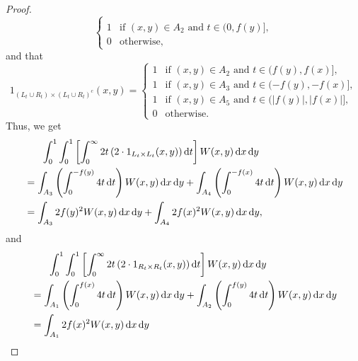 \documentclass[12pt,a4paper,bold]{thesis}
\theoremstyle{definition}
\newcommand*{\abs}[1]{\left\vert #1 \right\vert}
\begin{document}
\begin{proof}
\begin{equation*}
\begin{cases}
            \\
            1 & \text{if } (x,y) \in A_2 \text{ and } t \in (0, f(y)],
            \\
            0 & \text{otherwise,}
        \end{cases} 
    \end{equation*}
    and that
    \begin{equation*}
        1_{(L_t \cup R_t) \times (L_t \cup R_t)^c}(x,y) =
        \begin{cases}
            1 & \text{if } (x,y) \in A_2 \text{ and } t \in (f(y), f(x)],
            \\
            1 & \text{if } (x,y) \in A_3 \text{ and } t \in (-f(y), -f(x)],
            \\
            1 & \text{if } (x,y) \in A_5 \text{ and } t \in (\abs{f(y)}, \abs{f(x)}],
            \\
            0 & \text{otherwise.}
        \end{cases} 
    \end{equation*}
    Thus, we get
    \begin{align*}
        & \hspace{0.6cm} \int_0^1 \int_{0}^{1} 
        \left[\int_{0}^{\infty} 2t \left(2 \cdot 1_{L_t \times L_t}(x,y)
        \right) \mathrm{d}t\right] W(x,y)\, \mathrm{d}x\, \mathrm{d}y
        \\
        & = 
        \int_{A_3} \left(\int_{0}^{-f(y)} 4t\, \mathrm{d}t\right) W(x,y)\, 
        \mathrm{d}x\, \mathrm{d}y + \int_{A_4} \left(\int_{0}^{-f(x)} 4t\, 
        \mathrm{d}t\right) W(x,y)\, \mathrm{d}x\, \mathrm{d}y
        \\
        & =
        \int_{A_3} 2f(y)^2 W(x,y)\, \mathrm{d}x\, \mathrm{d}y 
        + \int_{A_4} 2f(x)^2 W(x,y)\, \mathrm{d}x\, \mathrm{d}y,
    \end{align*}
    and
    \begin{align*}
        & \hspace{0.6cm} \int_0^1 \int_{0}^{1} 
        \left[\int_{0}^{\infty} 2t \left(2 \cdot 1_{R_t \times R_t}(x,y)
        \right) \mathrm{d}t\right] W(x,y)\, \mathrm{d}x\, \mathrm{d}y
        \\
        & = 
        \int_{A_1} \left(\int_{0}^{f(x)} 4t\, \mathrm{d}t\right) W(x,y)\, 
        \mathrm{d}x\, \mathrm{d}y + \int_{A_2} \left(\int_{0}^{f(y)} 4t\, 
        \mathrm{d}t\right) W(x,y)\, \mathrm{d}x\, \mathrm{d}y
        \\
        & =
        \int_{A_1} 2f(x)^2 W(x,y)\, \mathrm{d}x\, \mathrm{d}y 

\end{align*}
\end{proof}
\end{document}
